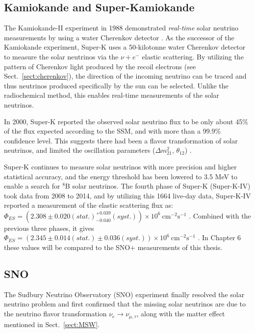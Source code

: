 \subsection{Kamiokande and Super-Kamiokande}\label{sect:superKsolarnu}
The Kamiokande-II experiment in 1988 demonstrated \emph{real-time} solar neutrino measurements by using a water Cherenkov detector \cite{superKwebsite}. As the successor of the Kamiokande experiment, Super-K uses a 50-kilotonne water Cherenkov detector to measure the solar neutrinos via the $\nu+e^-$ elastic scattering. By utilizing the pattern of Cherenkov light produced by the recoil electrons (see Sect.~\ref{sect:cherenkov}), the direction of the incoming neutrino can be traced and thus neutrinos produced specifically by the sun can be selected. Unlike the radiochemical method, this enables real-time measurements of the solar neutrinos.

In 2000, Super-K reported the observed solar neutrino flux to be only about 45\% of the flux expected according to the SSM, and with more than a 99.9\% confidence level. This suggests there had been a flavor transformation of solar neutrinos, and limited the oscillation parameters ($\Delta m^2_{21}$, $\theta_{12}$) \cite{superKwebsite}. 

Super-K continues to measure solar neutrinos with more precision and higher statistical accuracy, and the energy threshold has been lowered to 3.5 MeV to enable a search for $^8$B solar neutrinos. The fourth phase of Super-K (Super-K-IV) took data from 2008 to 2014, and by utilizing this 1664 live-day data, Super-K-IV reported a measurement of the elastic scattering flux as: $\Phi_{ES}=(2.308\pm0.020(stat.)^{+0.039}_{-0.040}(syst.))\times 10^6~\mathrm{cm^{-2}s^{-1}}$ \cite{abe2016solar}. Combined with the previous three phases, it gives $\Phi_{ES}=(2.345\pm0.014(stat.)\pm 0.036(syst.))\times 10^6~\mathrm{cm^{-2}s^{-1}}$ \cite{abe2016solar}. In Chapter 6 these values will be compared to the SNO+ measurements of this thesis.

\subsection{SNO}

The Sudbury Neutrino Observatory (SNO) experiment finally resolved the solar neutrino problem and first confirmed that the missing solar neutrinos are due to the neutrino flavor transformation $\nu_e\to\nu_{\mu,\tau}$, along with the matter effect mentioned in Sect.~\ref{sect:MSW}. 

